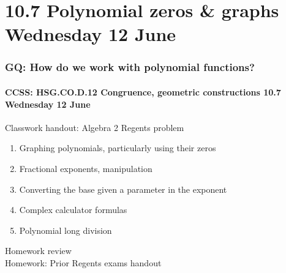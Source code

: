 \documentclass{beamer}
\begin{document}
\section{10.7 Polynomial zeros \& graphs Wednesday 12 June}
  \frame
  {
    \frametitle{GQ: How do we work with polynomial functions?}
    \framesubtitle{CCSS: HSG.CO.D.12 Congruence, geometric constructions \hfill \alert{10.7 Wednesday 12 June}}

    \begin{block}{Classwork handout: Algebra 2 Regents problem}
      \begin{enumerate}
        \item Graphing polynomials, particularly using their zeros
        \item Fractional exponents, manipulation
        \item Converting the base given a parameter in the exponent
        \item Complex calculator formulas
        \item Polynomial long division
      \end{enumerate}
    \end{block}
    Homework review\\[0.25cm]
    Homework: Prior Regents exams handout
  }
\end{document}
